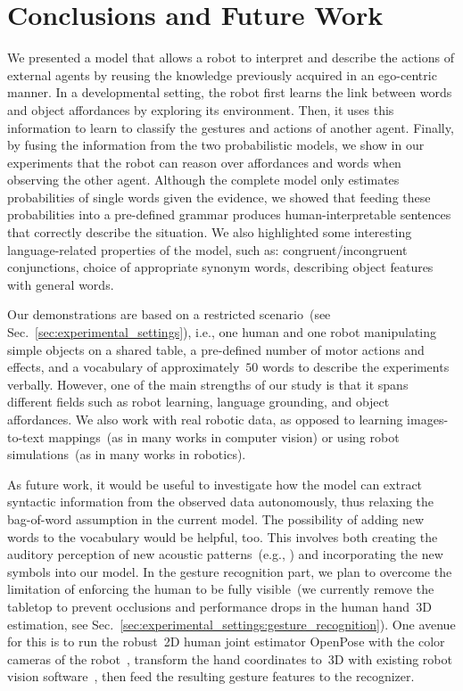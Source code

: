
\section{Conclusions and Future Work}
\label{sec:conclusions}

We presented a model that allows a robot to interpret and describe the actions of external agents by reusing the knowledge previously acquired in an ego-centric manner.
In a developmental setting, the robot first learns the link between words and object affordances by exploring its environment.
Then, it uses this information to learn to classify the gestures and actions of another agent.
Finally, by fusing the information from the two probabilistic models, we show in our experiments that the robot can reason over affordances and words when observing the other agent.
Although the complete model only estimates probabilities of single words given the evidence, we showed that feeding these probabilities into a pre-defined grammar produces human-interpretable sentences that correctly describe the situation.
We also highlighted some interesting language-related properties of the model, such as:
congruent/incongruent conjunctions,
choice of appropriate synonym words,
describing object features with general words.

Our demonstrations are based on a restricted scenario~(see Sec.~\ref{sec:experimental_settings}), i.e., one human and one robot manipulating simple objects on a shared table, a pre-defined number of motor actions and effects, and a vocabulary of approximately~$50$ words to describe the experiments verbally.
However, one of the main strengths of our study is that it spans different fields such as robot learning, language grounding, and object affordances.
We also work with real robotic data, as opposed to learning images-to-text mappings~(as in many works in computer vision) or using robot simulations~(as in many works in robotics).

As future work, it would be useful to investigate how the model can extract syntactic information from the observed data autonomously, thus relaxing the bag-of-word assumption in the current model.
The possibility of adding new words to the vocabulary would be helpful, too.
This involves both creating the auditory perception of new acoustic patterns~(e.g., \cite{falstrom:2017:glu, vanhainen2014:icassp, vanhainen:2012:interspeech}) and incorporating the new symbols into our \AffWords{} model.
In the gesture recognition part, we plan to overcome the limitation of enforcing the human to be fully visible~(we currently remove the tabletop to prevent occlusions and performance drops in the human hand~3D estimation, see Sec.~\ref{sec:experimental_settings:gesture_recognition}).
One avenue for this is to run the robust~2D human joint estimator OpenPose with the color cameras of the robot~\cite{cao:2017:openpose-cpvr}, transform the hand coordinates to~3D with existing robot vision software~\cite{roncone:2016:rss}, then feed the resulting gesture features to the recognizer.
